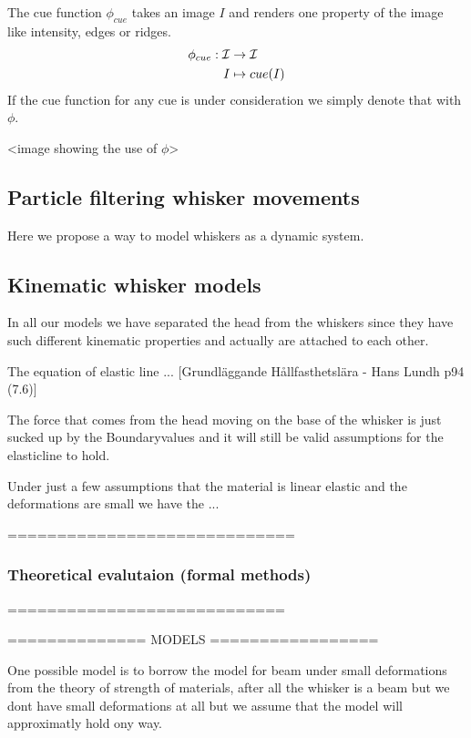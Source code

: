 \begin{definition}
    The cue function $\phi_{cue}$ takes an image $I$ and renders one property of the
    image like intensity, edges or ridges.
    \begin{equation}
        \begin{split}
            \phi_{cue} : \mathcal{I} &\rightarrow \mathcal{I}\\
                I &\mapsto cue(I)
        \end{split}
    \end{equation}
    If the cue function for any cue is under consideration we simply denote that with $\phi$.
\end{definition}


<image showing the use of $\phi$>


\subsection{Particle filtering whisker movements}
Here we propose a way to model whiskers as a dynamic system.

\subsection{Kinematic whisker models}

In all our models we have separated the head from the whiskers since they have
such different kinematic properties and actually are attached to each other.




The equation of elastic line ... [Grundläggande Hållfasthetslära - Hans Lundh
p94 (7.6)]

The force that comes from the head moving on the base of the whisker is just 
sucked up by the Boundaryvalues and it will still be valid assumptions for the
elasticline to hold.

Under just a few assumptions that the material is linear elastic and the
deformations are small we have the ...



=============================

\subsubsection{ Theoretical evalutaion (formal methods)}

============================

============== MODELS =================

One possible model is to borrow the model for beam under small 
deformations from the theory of strength of materials,
after all the whisker is a beam but we dont have small 
deformations at all but we assume that the model will approximatly hold ony way.



